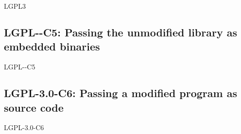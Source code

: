 \begin{license}{LGPL3}
\subsection{LGPL-\ver-C5: Passing the unmodified library as embedded binaries}
\begin{lsuc}{LGPL-\ver-C5}

  \useCaseFive

  \begin{lsucrequires}
    \lsucmandatory{\keepLicensingElements}
    \lsucmandatory{\lgplthreeEnsureCopyrightNoticeBinary}
    \lsucmandatory{\giveLicense}\passingFilesCorrectly
    \lsucmandatory{\makeUnmodifiedSourceAvailable}
    \lsucmandatory{\describeHowToGetSource}
    \lsucmandatory{\addToCopyrightDialogLibWeak}
    \lsucmandatory{\allowRelinking}
    \lsucoptional{\addToDocumentation}
    \lsucoptional{\retainCopyrightNotices}
  \end{lsucrequires}

  \begin{lsucprohibits}
    \lsucitem{\noPatentLitigation}
  \end{lsucprohibits}
\end{lsuc}


\subsection{LGPL-3.0-C6: Passing a modified program as source code}
\begin{lsuc}{LGPL-3.0-C6}
  
  \useCaseSix

  \begin{lsucrequires}
    \lsucmandatory{\keepLicensingElements}
    \lsucmandatory{\lgplthreeEnsureCopyrightNoticeSource}
    \lsucmandatory{\giveLicense}\passingFilesCorrectly
    \lsucmandatory{\retainCopyrightNotices}
    \lsucmandatory{\addToCopyrightDialogApp}
    \lsucmandatory{\markProgramModifications}
    \lsucmandatory{\arrangeProgramChanges}\howToApplyTheseTerms
    \lsucoptional{\createChangelog}
    \lsucoptional{\addToDocumentation}
  \end{lsucrequires}
 
  \begin{lsucprohibits}
    \lsucitem{\noPatentLitigation}
  \end{lsucprohibits}
\end{lsuc}


\end{license}
